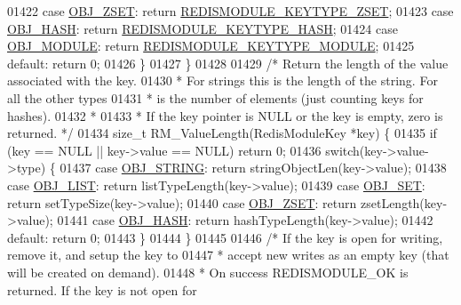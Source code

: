 \begin{DoxyCode}
{{{01422     \textcolor{keywordflow}{case} \hyperlink{server_8h_a8c356422ddbc03bd77694880a30a1953}{OBJ\_ZSET}: \textcolor{keywordflow}{return} \hyperlink{redismodule_8h_a93d1514d4c11cc65551b36cfd9a72cc2}{REDISMODULE\_KEYTYPE\_ZSET};
01423     \textcolor{keywordflow}{case} \hyperlink{server_8h_a87c05ba4f7f36741864277f02a4423fb}{OBJ\_HASH}: \textcolor{keywordflow}{return} \hyperlink{redismodule_8h_ac019575ac57520c325597e2fb54c5b71}{REDISMODULE\_KEYTYPE\_HASH};
01424     \textcolor{keywordflow}{case} \hyperlink{server_8h_a92c1fed85f709180fda0ff10d37d649b}{OBJ\_MODULE}: \textcolor{keywordflow}{return} \hyperlink{redismodule_8h_a7beeb7b9c1c8e419591b3affb5b01f93}{REDISMODULE\_KEYTYPE\_MODULE};
01425     \textcolor{keywordflow}{default}: \textcolor{keywordflow}{return} 0;
01426     \}
01427 \}
01428 
01429 \textcolor{comment}{/* Return the length of the value associated with the key.}
01430 \textcolor{comment}{ * For strings this is the length of the string. For all the other types}
01431 \textcolor{comment}{ * is the number of elements (just counting keys for hashes).}
01432 \textcolor{comment}{ *}
01433 \textcolor{comment}{ * If the key pointer is NULL or the key is empty, zero is returned. */}
01434 size\_t RM\_ValueLength(RedisModuleKey *key) \{
01435     \textcolor{keywordflow}{if} (key == NULL || key->value == NULL) \textcolor{keywordflow}{return} 0;
01436     \textcolor{keywordflow}{switch}(key->value->type) \{
01437     \textcolor{keywordflow}{case} \hyperlink{server_8h_a65236ea160f69cdef33ec942092af88f}{OBJ\_STRING}: \textcolor{keywordflow}{return} stringObjectLen(key->value);
01438     \textcolor{keywordflow}{case} \hyperlink{server_8h_a4a5f22a280949c97a0cb0d4213275126}{OBJ\_LIST}: \textcolor{keywordflow}{return} listTypeLength(key->value);
01439     \textcolor{keywordflow}{case} \hyperlink{server_8h_a8d179375a4aac33d3fa7aa80c8ccc75f}{OBJ\_SET}: \textcolor{keywordflow}{return} setTypeSize(key->value);
01440     \textcolor{keywordflow}{case} \hyperlink{server_8h_a8c356422ddbc03bd77694880a30a1953}{OBJ\_ZSET}: \textcolor{keywordflow}{return} zsetLength(key->value);
01441     \textcolor{keywordflow}{case} \hyperlink{server_8h_a87c05ba4f7f36741864277f02a4423fb}{OBJ\_HASH}: \textcolor{keywordflow}{return} hashTypeLength(key->value);
01442     \textcolor{keywordflow}{default}: \textcolor{keywordflow}{return} 0;
01443     \}
01444 \}
01445 
01446 \textcolor{comment}{/* If the key is open for writing, remove it, and setup the key to}
01447 \textcolor{comment}{ * accept new writes as an empty key (that will be created on demand).}
01448 \textcolor{comment}{ * On success REDISMODULE\_OK is returned. If the key is not open for}
}}}
\end{DoxyCode}
